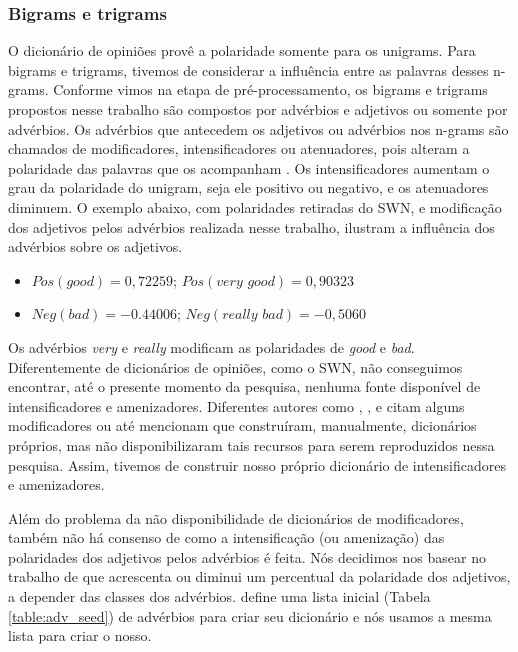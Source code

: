 \documentclass[template.tex]{subfiles}
\begin{document}
\subsubsection{Bigrams e trigrams}

O dicionário de opiniões provê a polaridade somente para os unigrams. Para bigrams e trigrams, tivemos de considerar a influência entre as palavras desses n-grams. Conforme vimos na etapa de pré-processamento, os bigrams e trigrams propostos nesse trabalho são compostos por advérbios e adjetivos ou somente por advérbios. Os advérbios que antecedem os adjetivos ou advérbios nos n-grams são chamados de modificadores, intensificadores ou atenuadores, pois alteram a polaridade das palavras que os acompanham \cite{voll2007not}. Os intensificadores aumentam o grau da polaridade do unigram, seja ele positivo ou negativo, e os atenuadores diminuem. O exemplo abaixo, com polaridades retiradas do SWN, e modificação dos adjetivos pelos advérbios realizada nesse trabalho, ilustram a influência dos advérbios sobre os adjetivos.  


\begin{itemize}
\item \label{itm:very_exem} $Pos(\textit{good}) = 0,72259$; $Pos(\textit{very good}) = 0,90323$
\item \label{itm:really_exem} $Neg(\textit{bad}) = -0.44006$; $Neg(\textit{really bad}) = -0,5060$
\end{itemize}

Os advérbios \textit{very} e \textit{really} modificam as polaridades de \textit{good} e \textit{bad}. Diferentemente de dicionários de opiniões, como o SWN, não conseguimos encontrar, até o presente momento da pesquisa, nenhuma fonte disponível de intensificadores e amenizadores. Diferentes autores como , ,  e  citam alguns modificadores ou até mencionam que construíram, manualmente, dicionários próprios, mas não disponibilizaram tais recursos para serem reproduzidos nessa pesquisa. Assim, tivemos de construir nosso próprio dicionário de intensificadores e amenizadores. 

Além do problema da não disponibilidade de dicionários de modificadores, também não há consenso de como a intensificação (ou amenização) das polaridades dos adjetivos pelos advérbios é feita. Nós decidimos nos basear no trabalho de  que acrescenta ou diminui um percentual da polaridade dos adjetivos, a depender das classes dos advérbios.  define uma lista inicial (Tabela \ref{table:adv_seed}) de advérbios para criar seu dicionário e nós usamos a mesma lista para criar o nosso.
\end{document}

